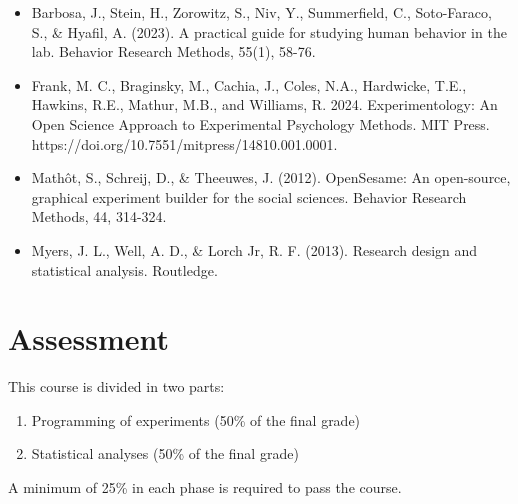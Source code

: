 \documentclass[
  letterpaper,
  DIV=11,
  numbers=noendperiod]{scrreprt}
\providecommand{\tightlist}{%
  \setlength{\itemsep}{0pt}\setlength{\parskip}{0pt}}\usepackage{longtable,booktabs,array}
\begin{document}
\begin{itemize}
\tightlist
\item
  Barbosa, J., Stein, H., Zorowitz, S., Niv, Y., Summerfield, C.,
  Soto-Faraco, S., \& Hyafil, A. (2023). A practical guide for studying
  human behavior in the lab. Behavior Research Methods, 55(1), 58-76.
\item
  Frank, M. C., Braginsky, M., Cachia, J., Coles, N.A., Hardwicke, T.E.,
  Hawkins, R.E., Mathur, M.B., and Williams, R. 2024. Experimentology:
  An Open Science Approach to Experimental Psychology Methods. MIT
  Press. https://doi.org/10.7551/mitpress/14810.001.0001.
\item
  Mathôt, S., Schreij, D., \& Theeuwes, J. (2012). OpenSesame: An
  open-source, graphical experiment builder for the social sciences.
  Behavior Research Methods, 44, 314-324.
\item
  Myers, J. L., Well, A. D., \& Lorch Jr, R. F. (2013). Research design
  and statistical analysis. Routledge.
\end{itemize}

\hypertarget{assessment}{%
\section{Assessment}\label{assessment}}

This course is divided in two parts:

\begin{enumerate}
\def\labelenumi{\arabic{enumi})}
\item
  Programming of experiments (50\% of the final grade)
\item
  Statistical analyses (50\% of the final grade)
\end{enumerate}

\begin{tcolorbox}[enhanced jigsaw, titlerule=0mm, left=2mm, colbacktitle=quarto-callout-warning-color!10!white, toptitle=1mm, colframe=quarto-callout-warning-color-frame, opacityback=0, leftrule=.75mm, title=\textcolor{quarto-callout-warning-color}{\faExclamationTriangle}\hspace{0.5em}{Important!}, coltitle=black, breakable, colback=white, bottomrule=.15mm, bottomtitle=1mm, arc=.35mm, toprule=.15mm, opacitybacktitle=0.6, rightrule=.15mm]

A minimum of 25\% in each phase is required to pass the course.

\end{tcolorbox}
\end{document}
